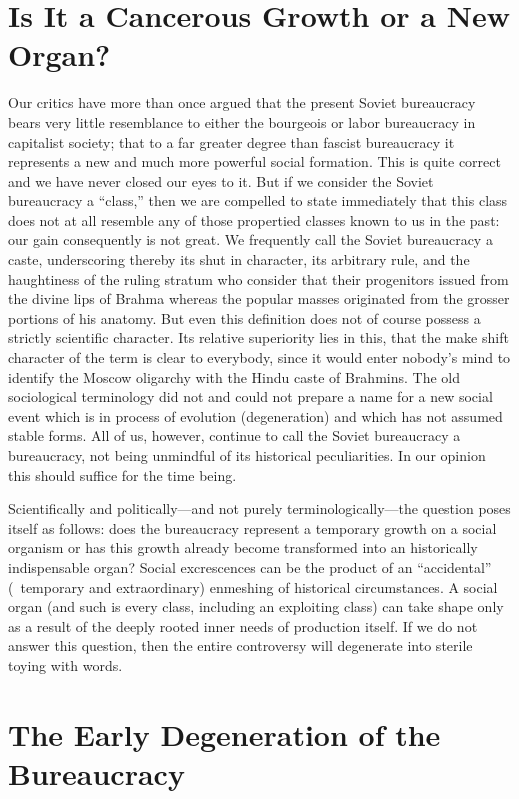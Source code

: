 \section*{Is It a Cancerous Growth or a New Organ?}

Our critics have more than once argued that the present Soviet bureaucracy bears very little resemblance to either the bourgeois or labor bureaucracy in capitalist society; that to a far greater degree than fascist bureaucracy it represents a new and much more powerful social formation. This is quite correct and we have never closed our eyes to it. But if we consider the Soviet bureaucracy a “class,” then we are compelled to state immediately that this class does not at all resemble any of those propertied classes known to us in the past: our gain consequently is not great. We frequently call the Soviet bureaucracy a caste, underscoring thereby its shut in character, its arbitrary rule, and the haughtiness of the ruling stratum who consider that their progenitors issued from the divine lips of Brahma whereas the popular masses originated from the grosser portions of his anatomy. But even this definition does not of course possess a strictly scientific character. Its relative superiority lies in this, that the make shift character of the term is clear to everybody, since it would enter nobody’s mind to identify the Moscow oligarchy with the Hindu caste of Brahmins. The old sociological terminology did not and could not prepare a name for a new social event which is in process of evolution (degeneration) and which has not assumed stable forms. All of us, however, continue to call the Soviet bureaucracy a bureaucracy, not being unmindful of its historical peculiarities. In our opinion this should suffice for the time being.

Scientifically and politically---and not purely terminologically---the question poses itself as follows: does the bureaucracy represent a temporary growth on a social organism or has this growth already become transformed into an historically indispensable organ? Social excrescences can be the product of an “accidental” (\ie\ temporary and extraordinary) enmeshing of historical circumstances. A social organ (and such is every class, including an exploiting class) can take shape only as a result of the deeply rooted inner needs of production itself. If we do not answer this question, then the entire controversy will degenerate into sterile toying with words.
\noclub

\section*{The Early Degeneration of the Bureaucracy}

